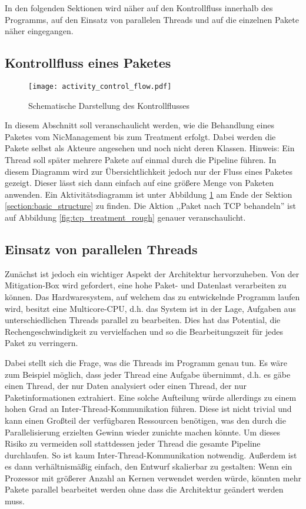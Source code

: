 \documentclass[../review_1.tex]{subfiles}
\begin{document}
In den folgenden Sektionen wird näher auf den Kontrollfluss innerhalb des Programms, auf den Einsatz von parallelen Threads und auf die einzelnen Pakete näher eingegangen.
\subsection{Kontrollfluss eines Paketes}
\begin{figure}[H]
	\centering
	\texttt{[image: activity\_control\_flow.pdf]}
	\caption{Schematische Darstellung des Kontrollflusses}
	\label{fig:control_flow}
\end{figure}
In diesem Abschnitt soll veranschaulicht werden, wie die Behandlung eines Paketes vom NicManagement bis zum Treatment erfolgt. Dabei werden die Pakete selbst als Akteure angesehen und noch nicht deren Klassen. Hinweis: Ein Thread soll später mehrere Pakete auf einmal durch die Pipeline führen. In diesem Diagramm wird zur Übersichtlichkeit jedoch nur der Fluss eines Paketes gezeigt. Dieser lässt sich dann einfach auf eine größere Menge von Paketen anwenden. Ein Aktivitätsdiagramm ist unter Abbildung \ref{fig:control_flow} am Ende der Sektion \ref{section:basic_structure} zu finden. Die Aktion ,,Paket nach TCP behandeln'' ist auf Abbildung \ref{fig:tcp_treatment_rough} genauer veranschaulicht.


\subsection{Einsatz von parallelen Threads}
Zunächst ist jedoch ein wichtiger Aspekt der Architektur hervorzuheben. Von der Mitigation-Box wird gefordert, eine hohe Paket- und Datenlast verarbeiten zu können. Das Hardwaresystem, auf welchem das zu entwickelnde Programm laufen wird, besitzt eine Multicore-CPU, d.h. das System ist in der Lage, Aufgaben aus unterschiedlichen Threads parallel zu bearbeiten. Dies hat das Potential, die Rechengeschwindigkeit zu vervielfachen und so die Bearbeitungszeit für jedes Paket zu verringern.

Dabei stellt sich die Frage, was die Threads im Programm genau tun. Es wäre zum Beispiel möglich, dass jeder Thread eine Aufgabe übernimmt, d.h. es gäbe einen Thread, der nur Daten analysiert oder einen Thread, der nur Paketinformationen extrahiert. Eine solche Aufteilung würde allerdings zu einem hohen Grad an Inter-Thread-Kommunikation führen. Diese ist nicht trivial und kann einen Großteil der verfügbaren Ressourcen benötigen, was den durch die Parallelisierung erzielten Gewinn wieder zunichte machen könnte. Um dieses Risiko zu vermeiden soll stattdessen jeder Thread die gesamte Pipeline durchlaufen. So ist kaum Inter-Thread-Kommunikation notwendig. Außerdem ist es dann verhältnismäßig einfach, den Entwurf skalierbar zu gestalten: Wenn ein Prozessor mit größerer Anzahl an Kernen verwendet werden würde, könnten mehr Pakete parallel bearbeitet werden ohne dass die Architektur geändert werden muss.
\end{document}

